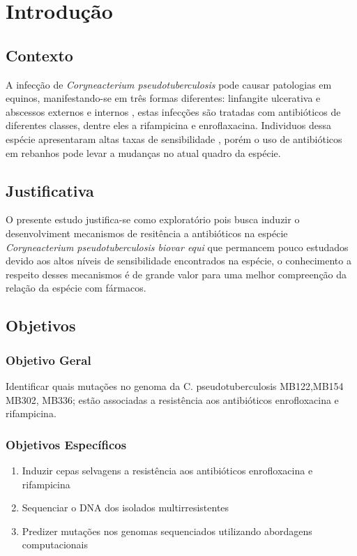 \chapter{Introdução}
\label{cap:introducao}

\section{Contexto}

A infecção de \textit{Coryneacterium pseudotuberculosis} pode causar patologias em equinos, manifestando-se em três formas diferentes: linfangite ulcerativa e abscessos externos e internos \cite{aleman1996}, estas infecções são tratadas com antibióticos de diferentes classes, dentre eles a rifampicina e enroflaxacina. 
Individuos dessa espécie apresentaram altas taxas de sensibilidade \cite{rhodes2015}, porém o uso de antibióticos em rebanhos pode levar a mudanças no atual quadro
da espécie. 

\section{Justificativa}
O presente estudo justifica-se como exploratório pois busca induzir o desenvolviment mecanismos de resitência a antibióticos na espécie 
\textit{Coryneacterium pseudotuberculosis biovar equi} que permancem pouco estudados devido aos altos níveis de sensibilidade
encontrados na espécie, o conhecimento a respeito desses mecanismos é de grande valor para uma melhor compreenção da relação da espécie com fármacos.

\section{Objetivos}

\subsection{Objetivo Geral}

Identificar quais mutações no genoma da C. pseudotuberculosis MB122,MB154 MB302, MB336; estão associadas a resistência aos antibióticos enrofloxacina e rifampicina.

\subsection{Objetivos Específicos}
\begin{enumerate}
    \item Induzir cepas selvagens a resistência aos antibióticos enrofloxacina e rifampicina
    \item Sequenciar o DNA dos isolados multirresistentes
    \item Predizer mutações nos genomas sequenciados utilizando abordagens computacionais
\end{enumerate}

